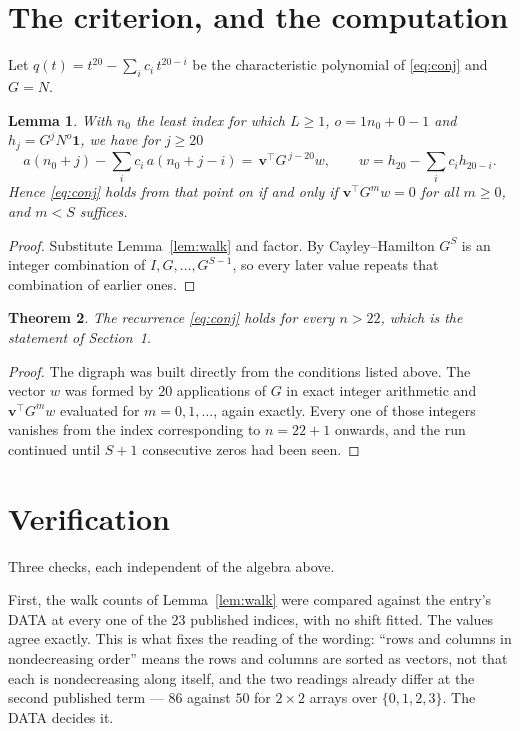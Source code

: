 \documentclass[11pt,a4paper]{article}
\theoremstyle{plain}
\newtheorem{theorem}{Theorem}
\newtheorem{lemma}[theorem]{Lemma}
\theoremstyle{definition}
\begin{document}
\section{The criterion, and the computation}

Let $q(t)=t^{20}-\sum_i c_i\,t^{20-i}$ be the characteristic polynomial of
\eqref{eq:conj} and $G=N$.

\begin{lemma}\label{lem:crit}
With $n_0$ the least index for which $L\ge1$, $o=1n_0+0-1$ and
$h_j=G^{j}N^{o}\mathbf{1}$, we have for $j\ge20$
\[
a(n_0+j)-\sum_i c_i\,a(n_0+j-i)=\,\mathbf{v}^{\!\top}G^{\,j-20}w,
\qquad w=h_{20}-\sum_i c_ih_{20-i} .
\]
Hence \eqref{eq:conj} holds from that point on if and only if
$\mathbf{v}^{\!\top}G^{m}w=0$ for all $m\ge0$, and $m<S$ suffices.
\end{lemma}

\begin{proof}
Substitute Lemma~\ref{lem:walk} and factor. By Cayley--Hamilton $G^{S}$ is an integer
combination of $I,G,\dots,G^{S-1}$, so every later value repeats that combination of
earlier ones.
\end{proof}

\begin{theorem}
The recurrence \eqref{eq:conj} holds for every $n>22$, which is the statement of
Section~1.
\end{theorem}

\begin{proof}
The digraph was built directly from the conditions listed above. The vector $w$ was formed by
$20$ applications of $G$ in exact integer arithmetic and $\mathbf{v}^{\!\top}G^{m}w$
evaluated for $m=0,1,\dots$, again exactly. Every one of those integers vanishes from the
index corresponding to $n=22+1$ onwards, and the run continued until $S+1$ consecutive
zeros had been seen.
\end{proof}

\section{Verification}

Three checks, each independent of the algebra above.

First, the walk counts of Lemma~\ref{lem:walk} were compared against the entry's DATA at
every one of the $23$ published indices, with no shift fitted. The values agree exactly.
This is what fixes the reading of the wording: ``rows and columns in nondecreasing order''
means the rows and columns are sorted as vectors, not that each is nondecreasing along
itself, and the two readings already differ at the second published term --- $86$ against
$50$ for $2\times2$ arrays over $\{0,1,2,3\}$. The DATA decides it.
\end{document}
